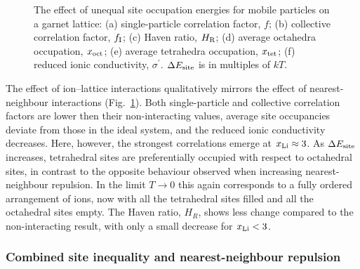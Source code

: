 \documentclass[aps,prb,twocolumn,superscriptaddress,reprint]{revtex4-1}
\newcommand{\xLi}{x_\m{Li}}
\begin{document}
\begin{figure}[tb]
  \centering
    \caption{\label{fig:site_energies_data}The effect of unequal site occupation energies for mobile particles on a garnet lattice: (a) single-particle correlation factor, $f$; (b) collective correlation factor, $f_{\mathrm{I}}$; (c) Haven ratio, $H_{\mathrm{R}}$; (d) average octahedra occupation, $x_{\mathrm{oct}}$; (e) average tetrahedra occupation, $x_{\mathrm{tet}}$; (f) reduced ionic conductivity, $\sigma^\prime$. $\Delta E_{\mathrm{site}}$ is in multiples of $kT$.}
\end{figure}

The effect of ion--lattice interactions qualitatively mirrors the effect of nearest-neighbour interactions (Fig.~\ref{fig:site_energies_data}). Both single-particle and collective correlation factors are lower then their non-interacting values, average site occupancies deviate from those in the ideal system, and the reduced ionic conductivity decreases. Here, however, the strongest correlations emerge at $\xLi\approx3$. As $\Delta E_{\mathrm{site}}$ increases, tetrahedral sites are preferentially occupied with respect to octahedral sites, in contrast to the opposite behaviour observed when increasing nearest-neighbour repulsion. In the limit $T\to0$ this again corresponds to a fully ordered arrangement of ions, now with all the tetrahedral sites filled and all the octahedral sites empty. The Haven ratio, $H_R$, shows less change compared to the non-interacting result, with only a small decrease for $\xLi<3$.

\subsubsection{Combined site inequality and nearest-neighbour repulsion}
\end{document}
